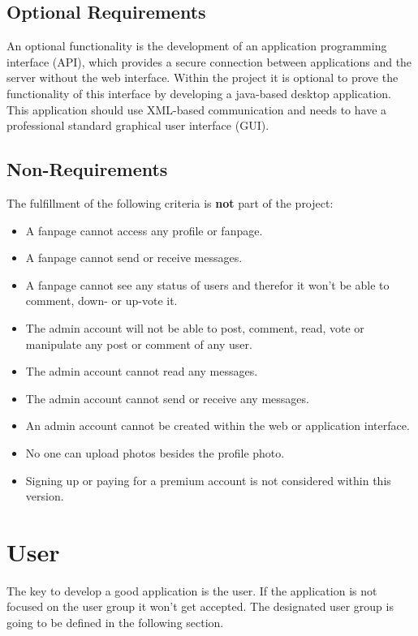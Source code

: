 \documentclass[11pt,a4paper]{report}
\begin{document}
\subsection{Optional Requirements}
An optional functionality is the development of an application programming interface (API), which provides a secure connection between applications and  the  server  without the web interface. Within the project it is optional to prove the functionality of this interface by developing a java-based desktop application. This application should use XML-based communication and needs to have a professional standard graphical user interface (GUI).

\subsection{Non-Requirements}
The fulfillment of the following criteria is \textbf{not} part of the project:
\begin{itemize}
    \item A fanpage cannot access any profile or fanpage.
    \item A fanpage cannot send or receive messages.
    \item A fanpage cannot see any status of users and therefor it won't be able to comment, down- or up-vote it.
    \item The admin account will not be able to post, comment, read, vote or manipulate any post or comment of any user.
    \item The admin account cannot read any messages.
    \item The admin account cannot send or receive any messages.
    \item An admin account cannot be created within the web or application interface.
    \item No one can upload photos besides the profile photo.
    \item Signing up or paying for a premium account is not considered within this version.
\end{itemize}

\section{User}
The key to develop a good application is the user. If the application is not focused on the user group it won't get accepted. The designated user group is going to be defined in the following section.
\end{document}
